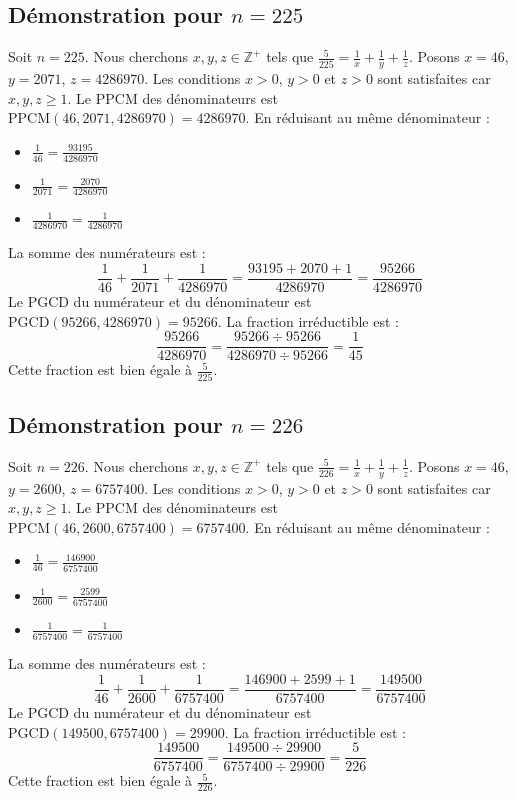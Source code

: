 \documentclass[11pt,a4paper]{article}
\begin{document}
\subsection{Démonstration pour $n = 225$}
Soit $n = 225$. Nous cherchons $x, y, z \in \mathbb{Z}^{+}$ tels que $\frac{5}{225} = \frac{1}{x} + \frac{1}{y} + \frac{1}{z}$.
Posons $x = 46$, $y = 2071$, $z = 4286970$.
Les conditions $x > 0$, $y > 0$ et $z > 0$ sont satisfaites car $x, y, z \geq 1$.
Le PPCM des dénominateurs est $\text{PPCM}(46, 2071, 4286970) = 4286970$.
En réduisant au même dénominateur :
\begin{itemize}
    \item $\frac{1}{46} = \frac{93195}{4286970}$
    \item $\frac{1}{2071} = \frac{2070}{4286970}$
    \item $\frac{1}{4286970} = \frac{1}{4286970}$
\end{itemize}
La somme des numérateurs est :
$$ \frac{1}{46} + \frac{1}{2071} + \frac{1}{4286970} = \frac{93195 + 2070 + 1}{4286970} = \frac{95266}{4286970} $$
Le PGCD du numérateur et du dénominateur est $\text{PGCD}(95266, 4286970) = 95266$.
La fraction irréductible est :
$$ \frac{95266}{4286970} = \frac{95266 \div 95266}{4286970 \div 95266} = \frac{1}{45} $$
Cette fraction est bien égale à $\frac{5}{225}$.

\subsection{Démonstration pour $n = 226$}
Soit $n = 226$. Nous cherchons $x, y, z \in \mathbb{Z}^{+}$ tels que $\frac{5}{226} = \frac{1}{x} + \frac{1}{y} + \frac{1}{z}$.
Posons $x = 46$, $y = 2600$, $z = 6757400$.
Les conditions $x > 0$, $y > 0$ et $z > 0$ sont satisfaites car $x, y, z \geq 1$.
Le PPCM des dénominateurs est $\text{PPCM}(46, 2600, 6757400) = 6757400$.
En réduisant au même dénominateur :
\begin{itemize}
    \item $\frac{1}{46} = \frac{146900}{6757400}$
    \item $\frac{1}{2600} = \frac{2599}{6757400}$
    \item $\frac{1}{6757400} = \frac{1}{6757400}$
\end{itemize}
La somme des numérateurs est :
$$ \frac{1}{46} + \frac{1}{2600} + \frac{1}{6757400} = \frac{146900 + 2599 + 1}{6757400} = \frac{149500}{6757400} $$
Le PGCD du numérateur et du dénominateur est $\text{PGCD}(149500, 6757400) = 29900$.
La fraction irréductible est :
$$ \frac{149500}{6757400} = \frac{149500 \div 29900}{6757400 \div 29900} = \frac{5}{226} $$
Cette fraction est bien égale à $\frac{5}{226}$.
\end{document}
